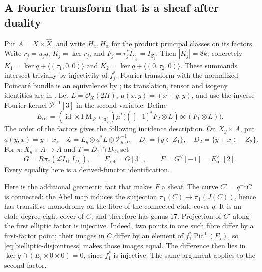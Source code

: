 \documentclass[11pt]{article}
\theoremstyle{definition}
\theoremstyle{remark}
\begin{document}
\subsection{A Fourier transform that is a sheaf after duality}
Put $A=X\times\widehat X$, and write $H_x,H_\alpha$ for the product principal classes on its factors. Write $r_j=u_jq$, $K_j=\ker r_j$, and $F_j=r_j^*I_{\bar C_j}=I_{Z_j}$. Then $|K_j|=8k$; concretely $K_1=\ker q+\langle(\tau_1,0,0)\rangle$ and $K_2=\ker q+\langle(0,\tau_2,0)\rangle$. These summands intersect trivially by injectivity of $f_j^*$. Fourier transform with the normalized Poincar\'e bundle is an equivalence by \cite[Theorem~2.2, p.~156]{Mukai}; its translation, tensor and isogeny identities are in \cite[\S3, especially (3.1) and Proposition~3.11]{Mukai}.
Let $L=\mathcal O_X(2H)$, $\mu(x,y)=(x+y,y)$, and use the inverse
Fourier kernel $\mathcal P^{-1}[3]$ in the second variable. Define
\begin{equation}\label{eq:effective-transform}
 E_{\mathrm{ref}}=
 (\operatorname{id}\times\mathrm{FM}_{\mathcal P^{-1}[3]})
 \mu^*\bigl(([-1]^*F_2\otimes L)\boxtimes(F_1\otimes L)\bigr).
\end{equation}
The order of the factors gives the following incidence description. On $X_y\times A$, put
\[
 a(y,x)=y+x,\quad
 \mathcal L=L_y\otimes a^*L\otimes\mathcal P_{y,\alpha}^{-1},
 \quad D_1=\{y\in Z_1\},\quad D_2=\{y+x\in-Z_2\}.
\]
For $\pi:X_y\times A\to A$ and $T=D_1\cap D_2$, set
\begin{equation}\label{eq:effective-duality}
 G=R\pi_*(\mathcal L I_{D_1}I_{D_2}),
 \qquad E_{\mathrm{ref}}=G[3],\qquad F=G^\vee[-1]
               =E_{\mathrm{ref}}^\vee[2].                 
\end{equation}
Every equality here is a derived-functor identification.

Here is the additional geometric fact that makes $F$ a sheaf.
The curve $C'=q^{-1}C$ is connected: the Abel map induces the
surjection $\pi_1(C)\to\pi_1(J(C))$, hence has transitive monodromy
on the fibre of the connected etale cover $q$. It is an etale
degree-eight cover of $C$, and therefore has genus $17$. Projection
of $C'$ along the first elliptic factor is injective. Indeed, two
points in one such fibre differ by a first-factor point; their
images in $C$ differ by an element of $f_1^*\operatorname{Pic}^0(E_i)$, so \eqref{eq:bielliptic-disjointness} makes those
images equal. The difference then lies in
$\ker q\cap(E_i\times0\times0)=0$, since $f_1^*$ is injective.
The same argument applies to the second factor.
\end{document}
